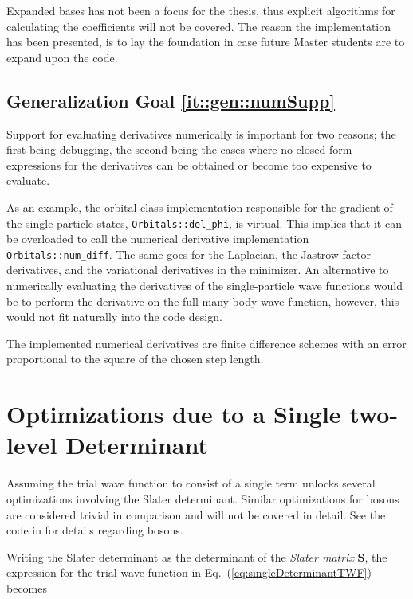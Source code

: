 Expanded bases has not been a focus for the thesis, thus explicit algorithms for calculating the coefficients will not be covered. The reason the implementation has been presented, is to lay the foundation in case future Master students are to expand upon the code.

\subsection{Generalization Goal \ref{it::gen::numSupp}}

Support for evaluating derivatives numerically is important for two reasons; the first being debugging, the second being the cases where no closed-form expressions for the derivatives can be obtained or become too expensive to evaluate.

As an example, the orbital class implementation responsible for the gradient of the single-particle states, \verb+Orbitals::del_phi+, is virtual. This implies that it can be overloaded to call the numerical derivative implementation \verb+Orbitals::num_diff+. The same goes for the Laplacian, the Jastrow factor derivatives, and the variational derivatives in the minimizer. An alternative to numerically evaluating the derivatives of the single-particle wave functions would be to perform the derivative on the full many-body wave function, however, this would not fit naturally into the code design.

The implemented numerical derivatives are finite difference schemes with an error proportional to the square of the chosen step length.

\section{Optimizations due to a Single two-level Determinant}
\label{sec:optSingleSlater}

Assuming the trial wave function to consist of a single term unlocks several optimizations involving the Slater determinant. Similar optimizations for bosons are considered trivial in comparison and will not be covered in detail. See the code in \cite{libBorealisCode} for details regarding bosons.

Writing the Slater determinant as the determinant of the \textit{Slater matrix} $\mathbf{S}$, the expression for the trial wave function in Eq.~(\ref{eq:singleDeterminantTWF}) becomes

\newcommand{\PTd}{|\mathbf{S}^\uparrow||\mathbf{S}^\downarrow |J}
\newcommand{\Du}{|\mathbf{S}^\uparrow|}
\newcommand{\Dd}{|\mathbf{S}^\downarrow|}
\newcommand{\Da }{|\mathbf{S}^{\alpha}|}
\newcommand{\Daa}{|\mathbf{S}^{\overline{\alpha}}|}
\newcommand{\PTda}{\Da\Daa J}

